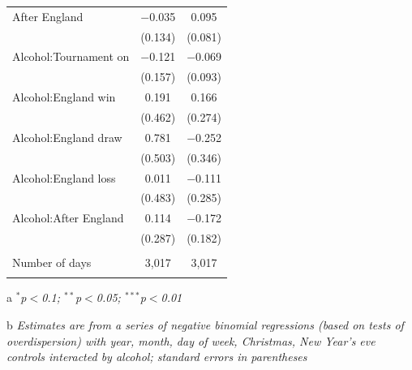 \documentclass[12pt, letterpaper]{article}
\begin{document}
\begin{table}[htp]
{\begin{threeparttable}
\begin{tabular}{@{\extracolsep{5pt}}lcc}
  After England & $-$0.035 & 0.095 \\ 
  & (0.134) & (0.081) \\ 
  Alcohol:Tournament on & $-$0.121 & $-$0.069 \\ 
  & (0.157) & (0.093) \\ 
  Alcohol:England win & 0.191 & 0.166 \\ 
  & (0.462) & (0.274) \\ 
  Alcohol:England draw & 0.781 & $-$0.252 \\ 
  & (0.503) & (0.346) \\ 
  Alcohol:England loss & 0.011 & $-$0.111 \\ 
  & (0.483) & (0.285) \\ 
  Alcohol:After England & 0.114 & $-$0.172 \\ 
  & (0.287) & (0.182) \\ 
 \hline \\[-1.8ex] 
Number of days & 3,017 & 3,017  \\ 
\hline 
\hline \\[-1.8ex] 
\end{tabular}
\begin{tablenotes}
      \item[a] \textit{$^{*}$p$<$0.1; $^{**}$p$<$0.05; $^{***}$p$<$0.01}
      \item[b] \textit{Estimates are from a series of negative binomial regressions (based on tests of overdispersion)  with year, month, day of week, Christmas, New Year's eve controls interacted by alcohol; standard errors in parentheses}
    \end{tablenotes}
\end{threeparttable} } 
\end{table}
\newpage
\end{document}
